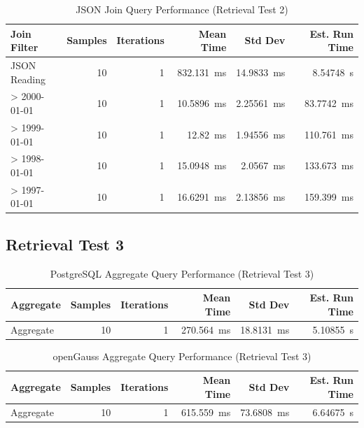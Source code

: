 \documentclass[14pt,a4paper]{article}
\begin{document}
    \begin{table}[H]
        \centering        
        \begin{tabular}{lrrrrr}
            \toprule
            \textbf{Join Filter} & \textbf{Samples} & \textbf{Iterations} & \textbf{Mean Time} & \textbf{Std Dev} & \textbf{Est. Run Time} \\
            \midrule
            JSON Reading & 10 & 1 & \qty{832.131}{\milli\second} & \qty{14.9833}{\milli\second} & \qty{8.54748}{\second} \\
            > 2000-01-01 & 10 & 1 & \qty{10.5896}{\milli\second} & \qty{2.25561}{\milli\second} & \qty{83.7742}{\milli\second} \\
            > 1999-01-01 & 10 & 1 & \qty{12.82}{\milli\second} & \qty{1.94556}{\milli\second} & \qty{110.761}{\milli\second} \\
            > 1998-01-01 & 10 & 1 & \qty{15.0948}{\milli\second} & \qty{2.0567}{\milli\second} & \qty{133.673}{\milli\second} \\
            > 1997-01-01 & 10 & 1 & \qty{16.6291}{\milli\second} & \qty{2.13856}{\milli\second} & \qty{159.399}{\milli\second} \\
            \bottomrule
        \end{tabular}
        \caption{JSON Join Query Performance (Retrieval Test 2)}
    \end{table}
    
    \subsection{Retrieval Test 3}
    
    \begin{table}[H]
        \centering        
        \begin{tabular}{lrrrrr}
            \toprule
            \textbf{Aggregate} & \textbf{Samples} & \textbf{Iterations} & \textbf{Mean Time} & \textbf{Std Dev} & \textbf{Est. Run Time} \\
            \midrule
            Aggregate & 10 & 1 & \qty{270.564}{\milli\second} & \qty{18.8131}{\milli\second} & \qty{5.10855}{\second} \\
            \bottomrule
        \end{tabular}
        \caption{PostgreSQL Aggregate Query Performance (Retrieval Test 3)}
    \end{table}
    
    \begin{table}[H]
        \centering        
        \begin{tabular}{lrrrrr}
            \toprule
            \textbf{Aggregate} & \textbf{Samples} & \textbf{Iterations} & \textbf{Mean Time} & \textbf{Std Dev} & \textbf{Est. Run Time} \\
            \midrule
            Aggregate & 10 & 1 & \qty{615.559}{\milli\second} & \qty{73.6808}{\milli\second} & \qty{6.64675}{\second} \\
            \bottomrule
        \end{tabular}
        \caption{openGauss Aggregate Query Performance (Retrieval Test 3)}
    \end{table}
    
\end{document}
